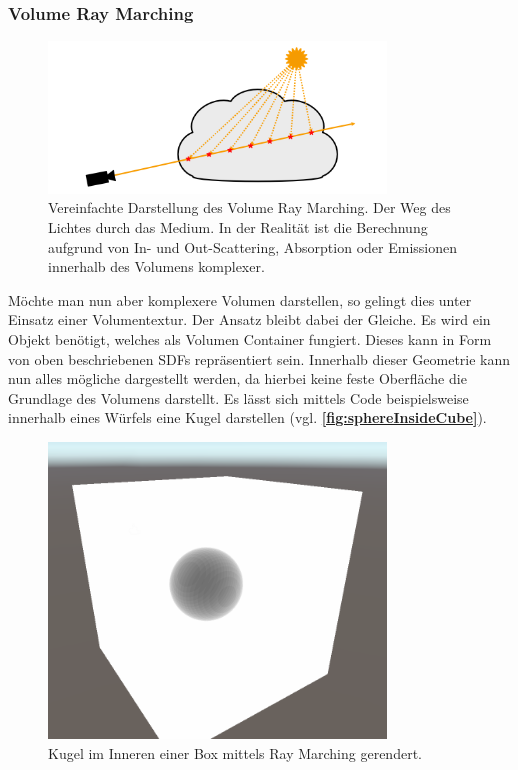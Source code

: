 



\subsubsection{Volume Ray Marching}

\begin{figure}[!h]
	\centering
	\includegraphics[width=0.80\textwidth]{Grafiken/Basics/Volume/Volume_RayMarching.png}
	\begin{footnotesize}
		\caption{Vereinfachte Darstellung des Volume Ray Marching. Der Weg des Lichtes durch
			das Medium. In der Realität ist die Berechnung aufgrund von In- und Out-Scattering, Absorption oder Emissionen innerhalb des
			Volumens komplexer.}
		\label{fig:volumeRayMarching}
	\end{footnotesize}
\end{figure}


Möchte man nun aber komplexere Volumen darstellen, so gelingt dies unter Einsatz einer Volumentextur. Der Ansatz bleibt dabei der Gleiche.
Es wird ein Objekt benötigt, welches als Volumen Container fungiert. Dieses kann in Form von oben beschriebenen SDFs repräsentiert sein.
Innerhalb dieser Geometrie kann nun alles mögliche dargestellt werden, da hierbei keine feste Oberfläche die Grundlage des
Volumens darstellt. Es lässt sich mittels Code beispielsweise innerhalb eines Würfels eine Kugel darstellen (vgl. \textbf{\autoref{fig:sphereInsideCube}}).

\begin{figure}[!h]
	\centering
	\includegraphics[width=0.80\textwidth]{Grafiken/Implementation/Raymarch/sphereInsideCube.png}
	\begin{footnotesize}
		\caption{Kugel im Inneren einer Box mittels Ray Marching gerendert.}
		\label{fig:sphereInsideCube}
	\end{footnotesize}
\end{figure}


